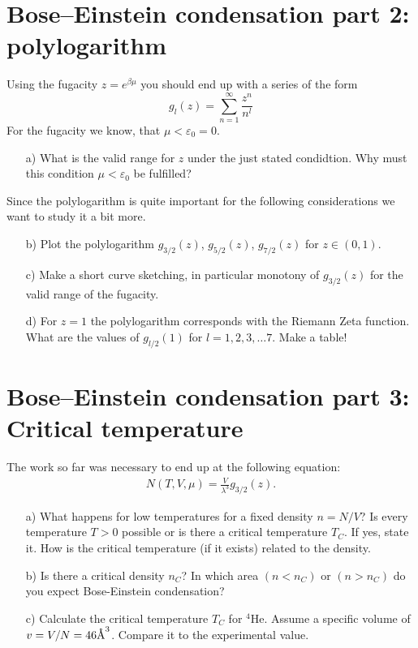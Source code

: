 \documentclass[12pt,a4paper]{article} %
\begin{document}
\section{Bose--Einstein condensation part 2: polylogarithm}
Using the fugacity $z = e^{\beta \mu}$ you should end up with a series of the form $$ g_l(z) = \sum_{n=1}^\infty \frac{z^n}{n^l} $$
For the fugacity we know, that $\mu < \varepsilon_0 = 0$.
\begin{itemize}
 \item [a)] What is the valid range for $z$ under the just stated condidtion. Why must this condition $\mu < \varepsilon_0$ be fulfilled?
\end{itemize}
Since the polylogarithm is quite important for the following considerations we want to study it a bit more.
\begin{itemize}
 \item[b)]  Plot the polylogarithm $g_{3/2}(z)$, $g_{5/2}(z)$, $g_{7/2}(z)$ for $z\in(0,1)$.
 \item[c)] Make a short curve sketching, in particular monotony of $g_{3/2}(z)$ for the valid range of the fugacity.
 \item[d)] For $z = 1$ the polylogarithm corresponds with the Riemann Zeta function. What are the values of $g_{l/2}(1)$ for $l = 1,2,3,\dots 7$.  Make a table!
\end{itemize}

\section{Bose--Einstein condensation part 3: Critical temperature}
The work so far was necessary to end up at the following equation:
\begin{align}
 N(T, V, \mu) = \frac{V}{\lambda^3} g_{3/2}(z).
\end{align}

\begin{itemize}
 \item[a)] What happens for low temperatures for a fixed density $n = N/V$? Is every temperature $T>0$ possible or is there a critical temperature $T_C$. If yes, state it. How is the critical temperature (if it exists) related to the density. 
 \item[b)] Is there a critical density $n_C$? In which area $(n< n_C)$ or $(n>n_C)$ do you expect Bose-Einstein condensation?
 \item[c)] Calculate the critical temperature $T_C$ for $^4$He. Assume a specific volume of $v = V/N = 46 \text{\normalfont\AA}^3$. Compare it to the experimental value.
\end{itemize}
\end{document}
